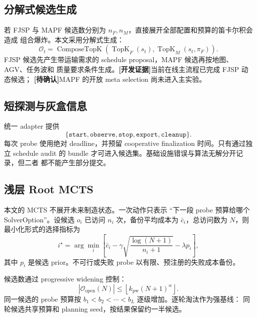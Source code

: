 \documentclass[11pt,a4paper]{article}
\newcommand{\development}{\textcolor{orange!80!black}{\textbf{[开发证据]}}}
\newcommand{\pending}{\textcolor{red!70!black}{\textbf{[待确认]}}}
\begin{document}
\subsection{分解式候选生成}

若 FJSP 与 MAPF 候选数分别为 \(n_F,n_M\)，直接展开全部配置和预算的笛卡尔积会造成
组合爆炸。本文采用分解式生成：
\begin{equation}
    \mathcal{O}_t =
    \operatorname{ComposeTopK}
    \left(
        \operatorname{TopK}_F(s_t),
        \operatorname{TopK}_M(s_t,\pi_F)
    \right).
\end{equation}
FJSP 候选先产生带运输需求的 schedule proposal，MAPF 候选再按地图、AGV、任务波和
质量要求条件生成。\development 当前在线主流程已完成 FJSP 动态候选；
\pending MAPF 的开放 meta selection 尚未进入主实验。

\subsection{短探测与灰盒信息}

统一 adapter 提供
\begin{equation}
    \{\texttt{start},\texttt{observe},\texttt{stop},
      \texttt{export},\texttt{cleanup}\}.
\end{equation}
每次 probe 使用绝对 deadline，并预留 cooperative finalization 时间。只有通过独立
schedule audit 的 bundle 才可进入候选集。基础设施错误与算法无解分开记录，但二者
都不能产生部分提交。

\subsection{浅层 Root MCTS}

本文的 MCTS 不展开未来制造状态。一次动作只表示 ``下一段 probe 预算给哪个
SolverOption''。设候选 \(o_i\) 已访问 \(n_i\) 次，备份平均成本为
\(\bar{c}_i\)，总访问数为 \(N\)，则最小化形式的选择指标为
\begin{equation}
    i^\star
    =
    \arg\min_i
    \left[
        \bar{c}_i
        -
        \gamma
        \sqrt{\frac{\log(N+1)}{n_i+1}}
        -
        \lambda p_i
    \right],
    \label{eq:uct}
\end{equation}
其中 \(p_i\) 是候选 prior。不可行或失败 probe 以有限、预注册的失败成本备份。

候选数通过 progressive widening 控制：
\begin{equation}
    |\mathcal{O}_{\mathrm{open}}(N)|
    \le
    \left\lfloor k_{\mathrm{pw}}(N+1)^{\alpha}\right\rfloor.
\end{equation}
同一候选的 probe 预算按 \(b_1<b_2<\cdots<b_L\) 逐级增加。逐轮淘汰作为强基线：
同轮候选共享预算和 planning seed，按结果保留约一半候选。
\end{document}
